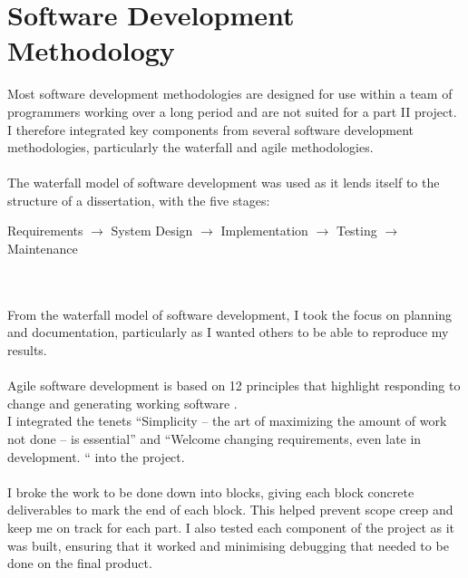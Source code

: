 \documentclass[12pt,a4paper]{report}
\begin{document}
\section{Software Development Methodology}
Most software development methodologies are designed for use within a team of programmers working over a long period and are not suited for a part II project. I therefore integrated key components from several software development methodologies, particularly the waterfall and agile methodologies. \\ \\
The waterfall model of software development was used as it lends itself to the structure of a dissertation, with the five stages: \\
\centerline{Requirements $\rightarrow$ System Design $\rightarrow$ Implementation $\rightarrow$ Testing $\rightarrow$ Maintenance} \\ \\
From the waterfall model of software development, I took the focus on planning and documentation, particularly as I wanted others to be able to reproduce my results. \\ \\ 
Agile software development is based on 12 principles that highlight responding to change and generating working software \cite{agile}. \\
I integrated the tenets ``Simplicity -- the art of maximizing the amount of work not done -- is essential'' \cite{agilep} and ``Welcome changing requirements, even late in development. `` \cite{agilep} into the project.  \\ \\ 
I broke the work to be done down into blocks, giving each block concrete deliverables to mark the end of each block. This helped prevent scope creep and keep me on track for each part. I also tested each component of the project as it was built, ensuring that it worked and minimising debugging that needed to be done on the final product. 
\end{document}
